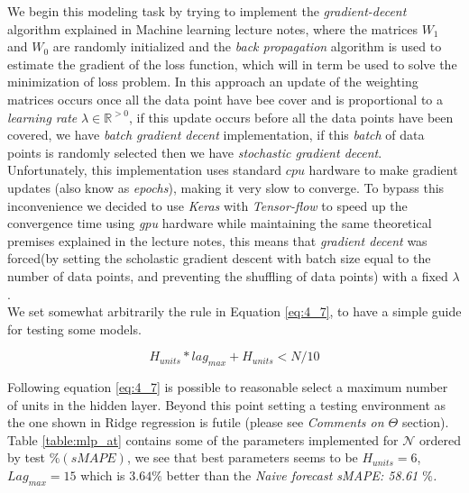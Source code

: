 We begin this modeling task by trying to implement the \emph{gradient-decent} algorithm explained in Machine learning lecture notes, where the matrices $W_{1}$  and $W_{0}$ are randomly initialized and the \emph{back propagation} algorithm is used to estimate the gradient of the loss function, which will in term be used to solve the minimization of loss problem. In this approach an update of the weighting matrices occurs once all the data point have bee cover and is proportional to a \emph{learning rate} $\lambda \in \mathbb{R}^{>0}$, if this update occurs before all the data points have been covered, we have \emph{batch gradient decent} implementation, if this \emph{batch} of data points is randomly selected then we have \emph{stochastic gradient decent}. Unfortunately, this implementation uses standard $cpu$ hardware to make gradient updates (also know as \emph{epochs}), making it very slow to converge. To bypass this inconvenience we decided to use \emph{Keras} with \emph{Tensor-flow}\cite{chollet2015keras} to speed up the convergence time using \emph{gpu} hardware while maintaining the same theoretical premises explained in the lecture notes, this means that \emph{gradient decent} was forced(by setting the scholastic gradient descent with batch size equal to the number of data points, and preventing the shuffling of data points) with a fixed  $\lambda$.\\

We set somewhat arbitrarily the rule in Equation \ref{eq:4_7}, to have a simple guide for testing some models.


\begin{equation}
H_{units}*lag_{max}+H_{units}<N/10
\label{eq:4_7}
\end{equation}

Following equation \ref{eq:4_7} is possible to reasonable select a maximum number of units in the hidden layer. Beyond this point setting a testing environment as the one shown in Ridge regression is futile (please see \textit{Comments on $\Theta$} section). Table \ref{table:mlp_at} contains some of the parameters implemented  for $\mathcal{N}$ ordered by test $\%(sMAPE)$, we see that best parameters seems to be $H_{units}=6$, $Lag_{max}=15$ which is $3.64\%$  better than the \textit{Naive forecast sMAPE: 58.61 $\%$.}\\


